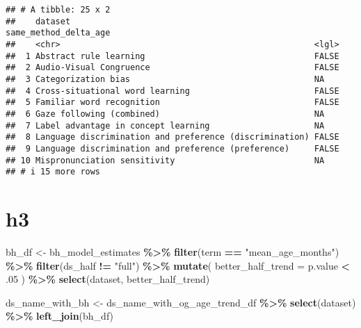 \documentclass[
]{article}
\newenvironment{Shaded}{\begin{snugshade}}{\end{snugshade}}
\newcommand{\AttributeTok}[1]{\textcolor[rgb]{0.13,0.29,0.53}{#1}}
\newcommand{\DecValTok}[1]{\textcolor[rgb]{0.00,0.00,0.81}{#1}}
\newcommand{\FunctionTok}[1]{\textcolor[rgb]{0.13,0.29,0.53}{\textbf{#1}}}
\newcommand{\NormalTok}[1]{#1}
\newcommand{\OtherTok}[1]{\textcolor[rgb]{0.56,0.35,0.01}{#1}}
\newcommand{\SpecialCharTok}[1]{\textcolor[rgb]{0.81,0.36,0.00}{\textbf{#1}}}
\newcommand{\StringTok}[1]{\textcolor[rgb]{0.31,0.60,0.02}{#1}}
\begin{document}
\begin{verbatim}
## # A tibble: 25 x 2
##    dataset                                                 same_method_delta_age
##    <chr>                                                   <lgl>                
##  1 Abstract rule learning                                  FALSE                
##  2 Audio-Visual Congruence                                 FALSE                
##  3 Categorization bias                                     NA                   
##  4 Cross-situational word learning                         FALSE                
##  5 Familiar word recognition                               FALSE                
##  6 Gaze following (combined)                               NA                   
##  7 Label advantage in concept learning                     NA                   
##  8 Language discrimination and preference (discrimination) FALSE                
##  9 Language discrimination and preference (preference)     FALSE                
## 10 Mispronunciation sensitivity                            NA                   
## # i 15 more rows
\end{verbatim}

\hypertarget{h3}{%
\section{h3}\label{h3}}

\begin{Shaded}
\begin{Highlighting}[]
\NormalTok{bh\_df }\OtherTok{\textless{}{-}}\NormalTok{ bh\_model\_estimates }\SpecialCharTok{\%\textgreater{}\%} 
  \FunctionTok{filter}\NormalTok{(term }\SpecialCharTok{==} \StringTok{"mean\_age\_months"}\NormalTok{) }\SpecialCharTok{\%\textgreater{}\%} 
  \FunctionTok{filter}\NormalTok{(ds\_half }\SpecialCharTok{!=} \StringTok{"full"}\NormalTok{) }\SpecialCharTok{\%\textgreater{}\%} 
  \FunctionTok{mutate}\NormalTok{(}
    \AttributeTok{better\_half\_trend =}\NormalTok{ p.value }\SpecialCharTok{\textless{}}\NormalTok{ .}\DecValTok{05}
\NormalTok{  ) }\SpecialCharTok{\%\textgreater{}\%} 
  \FunctionTok{select}\NormalTok{(dataset, better\_half\_trend)}

\NormalTok{ds\_name\_with\_bh }\OtherTok{\textless{}{-}}\NormalTok{ ds\_name\_with\_og\_age\_trend\_df }\SpecialCharTok{\%\textgreater{}\%} 
  \FunctionTok{select}\NormalTok{(dataset) }\SpecialCharTok{\%\textgreater{}\%} 
  \FunctionTok{left\_join}\NormalTok{(bh\_df)}
\end{Highlighting}
\end{Shaded}
\end{document}

